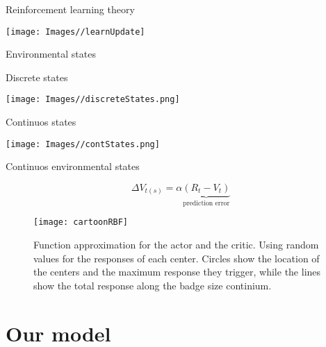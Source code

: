 \documentclass[
  ignorenonframetext,
]{beamer}
\begin{document}
\begin{frame}{Reinforcement learning theory}
\protect\hypertarget{reinforcement-learning-theory-1}{}

\begin{center}\texttt{[image: Images//learnUpdate]} \end{center}

\end{frame}

\begin{frame}{Environmental states}
\protect\hypertarget{environmental-states}{}

\begin{block}{Discrete states}

\texttt{[image: Images//discreteStates.png]}

\pause

\end{block}

\begin{block}{Continuos states}

\texttt{[image: Images//contStates.png]}

\end{block}

\end{frame}

\begin{frame}{Continuos environmental states}
\protect\hypertarget{continuos-environmental-states}{}

\begin{equation*}
  \Delta V_{t(s)}=\alpha \underbrace{(R_t-V_t)}_\text{prediction error}
\end{equation*}

\begin{figure}
\texttt{[image: cartoonRBF]} \caption{\label{fig:learning_cartoonRBF}Function approximation for the actor and the critic. Using random values for the responses of each center. Circles show the location of the centers and the maximum response they trigger, while the lines show the total response along the badge size continium.}\label{fig:fig2}
\end{figure}

\end{frame}

\hypertarget{our-model}{%
\section{Our model}\label{our-model}}
\end{document}
